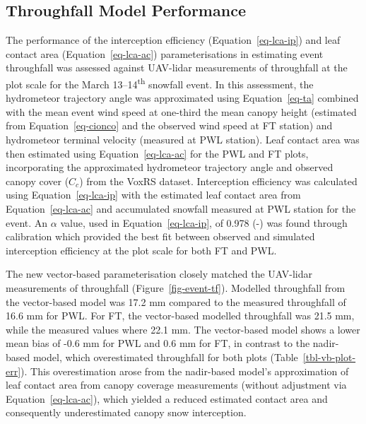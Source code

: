 \documentclass[
  letterpaper,
]{tex/uofsthesis-cs}
\begin{document}
\subsection{Throughfall Model
Performance}\label{throughfall-model-performance}

The performance of the interception efficiency
(Equation~\ref{eq-lca-ip}) and leaf contact area
(Equation~\ref{eq-lca-ac}) parameterisations in estimating event
throughfall was assessed against UAV-lidar measurements of throughfall
at the plot scale for the March 13--14\textsuperscript{th} snowfall
event. In this assessment, the hydrometeor trajectory angle was
approximated using Equation~\ref{eq-ta} combined with the mean event
wind speed at one-third the mean canopy height (estimated from
Equation~\ref{eq-cionco} and the observed wind speed at FT station) and
hydrometeor terminal velocity (measured at PWL station). Leaf contact
area was then estimated using Equation~\ref{eq-lca-ac} for the PWL and
FT plots, incorporating the approximated hydrometeor trajectory angle
and observed canopy cover (\(C_c\)) from the VoxRS dataset. Interception
efficiency was calculated using Equation~\ref{eq-lca-ip} with the
estimated leaf contact area from Equation~\ref{eq-lca-ac} and
accumulated snowfall measured at PWL station for the event. An
\(\alpha\) value, used in Equation~\ref{eq-lca-ip}, of 0.978 (-) was
found through calibration which provided the best fit between observed
and simulated interception efficiency at the plot scale for both FT and
PWL.

The new vector-based parameterisation closely matched the UAV-lidar
measurements of throughfall (Figure~\ref{fig-event-tf}). Modelled
throughfall from the vector-based model was 17.2 mm compared to the
measured throughfall of 16.6 mm for PWL. For FT, the vector-based
modelled throughfall was 21.5 mm, while the measured values where 22.1
mm. The vector-based model shows a lower mean bias of -0.6 mm for PWL
and 0.6 mm for FT, in contrast to the nadir-based model, which
overestimated throughfall for both plots (Table~\ref{tbl-vb-plot-err}).
This overestimation arose from the nadir-based model's approximation of
leaf contact area from canopy coverage measurements (without adjustment
via Equation~\ref{eq-lca-ac}), which yielded a reduced estimated contact
area and consequently underestimated canopy snow interception.
\end{document}
